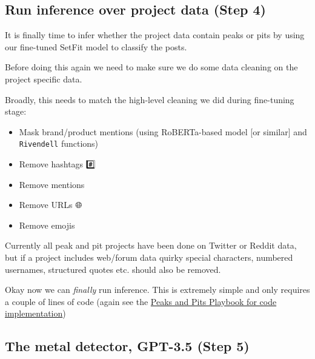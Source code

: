 \documentclass[
  letterpaper,
  DIV=11,
  numbers=noendperiod]{scrreprt}
\providecommand{\tightlist}{%
  \setlength{\itemsep}{0pt}\setlength{\parskip}{0pt}}\usepackage{longtable,booktabs,array}
\begin{document}
\subsection{Run inference over project data (Step 4)}\label{step-four}

It is finally time to infer whether the project data contain peaks or
pits by using our fine-tuned SetFit model to classify the posts.

Before doing this again we need to make sure we do some data cleaning on
the project specific data.

Broadly, this needs to match the high-level cleaning we did during
fine-tuning stage:

\begin{itemize}
\tightlist
\item
  Mask brand/product mentions (using RoBERTa-based model {[}or
  similar{]} and \texttt{Rivendell} functions)
\item
  Remove hashtags \#️⃣
\item
  Remove mentions 💬
\item
  Remove URLs 🌐
\item
  Remove emojis 🐙
\end{itemize}

\begin{tcolorbox}[enhanced jigsaw, opacitybacktitle=0.6, breakable, title=\textcolor{quarto-callout-warning-color}{\faExclamationTriangle}\hspace{0.5em}{Note on social media sources}, arc=.35mm, colframe=quarto-callout-warning-color-frame, colbacktitle=quarto-callout-warning-color!10!white, left=2mm, bottomrule=.15mm, opacityback=0, toprule=.15mm, bottomtitle=1mm, toptitle=1mm, titlerule=0mm, leftrule=.75mm, colback=white, rightrule=.15mm, coltitle=black]

Currently all peak and pit projects have been done on Twitter or Reddit
data, but if a project includes web/forum data quirky special
characters, numbered usernames, structured quotes etc. should also be
removed.

\end{tcolorbox}

Okay now we can \emph{finally} run inference. This is extremely simple
and only requires a couple of lines of code (again see the
\href{https://jamiehshare.github.io/peaks-pits-bookdown/step-five.html}{Peaks
and Pits Playbook for code implementation})

\subsection{The metal detector, GPT-3.5 (Step 5)}\label{step-five}
\end{document}
